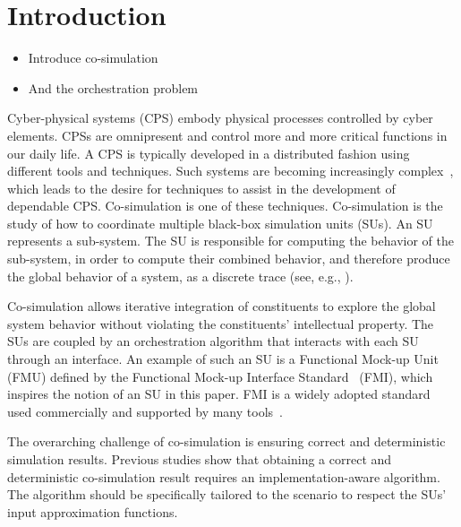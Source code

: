 \section{Introduction}\label{sc:introduction}
\begin{itemize}
    \item Introduce co-simulation
    \item And the orchestration problem
\end{itemize}

Cyber-physical systems (CPS) embody physical processes controlled by cyber elements. 
CPSs are omnipresent and control more and more critical functions in our daily life.
A CPS is typically developed in a distributed fashion using different tools and techniques. 
Such systems are becoming increasingly complex~\cite{4519604}, which leads to the desire for techniques to assist in the development of dependable CPS.
Co-simulation is one of these techniques. Co-simulation is the study of how to coordinate multiple black-box simulation units (SUs).
An SU represents a sub-system. 
The SU is responsible for computing the behavior of the sub-system, in order to compute their combined behavior, and therefore produce the global behavior of a system, as a discrete trace (see, e.g., \cite{Kubler2000,Gomes2018}).


Co-simulation allows iterative integration of constituents to explore the global system behavior without violating the constituents' intellectual property. 
The SUs are coupled by an orchestration algorithm that interacts with each SU through an interface.
An example of such an SU is a Functional Mock-up Unit (FMU) defined by the Functional Mock-up Interface Standard~\cite{FMI2014} (FMI), which inspires the notion of an SU in this paper. FMI is a widely adopted standard used commercially and supported by many tools~\cite{Tools_FMI}.

The overarching challenge of co-simulation is ensuring correct and deterministic simulation results. 
Previous studies \cite{Gomes2019,Oakes2021,Gomes2018f,Schweizer2015c} show that obtaining a correct and deterministic co-simulation result requires an implementation-aware algorithm.
The algorithm should be specifically tailored to the scenario to respect the SUs' input approximation functions.

